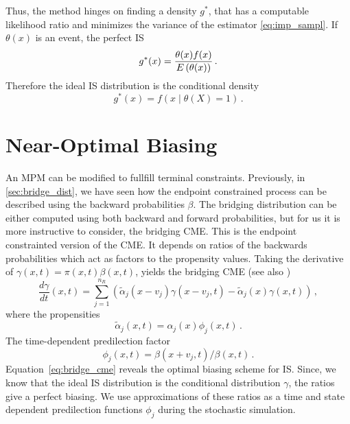 Thus, the method hinges on finding a density $g^{*}$, that has a computable likelihood ratio and  minimizes the variance of the estimator \eqref{eq:imp_sampl}.
If $\theta(x)$ is an event, the perfect \ac{IS} \parencite[Chapter~9.7.1]{kroese2013handbook}
\[
    g^*(x) = \frac{\theta(x) f(x)}{{E}\left(\theta(x)\right)}\,.
\]
Therefore the ideal \ac{IS} distribution is the conditional density
\[
    g^*(x) = f(x \mid \theta(X) = 1)\,.
\]

\section{Near-Optimal Biasing}
An \ac{MPM} can be modified to fullfill terminal constraints.
Previously, in \autoref{sec:bridge_dist}, we have seen how the endpoint constrained process can be described using the backward probabilities $\beta$.
The bridging distribution can be either computed using both backward and forward probabilities, but for us it is more instructive to consider, the bridging \ac{CME}.
This is the endpoint constrainted version of the \ac{CME}.
It depends on ratios of the backwards probabilities which act as factors to the propensity values.
Taking the derivative of $\gamma(x,t)=\pi(x,t)\beta(x,t)$, yields the bridging \ac{CME} (see also \citet{huang2016reconstructing})
\begin{equation}\label{eq:bridge_cme}
    \frac{d\gamma}{d t} ( x,t) =
    \sum_{j=1}^{n_R}\left(
        \tilde{\alpha}_j( x- v_j)\gamma( x- v_j,t) - \tilde{\alpha}_j( x)\gamma( x,t)
    \right)\,,
\end{equation}
where the propensities
\begin{equation}
    \tilde{\alpha}_j(x, t) = \alpha_j(x)\phi_j(x, t)\,.
\end{equation}
The time-dependent predilection factor
\begin{equation}\label{eq:dyn_predilection}
    \phi_j(x, t) = {\beta(x + v_j, t)}/{\beta(x, t)}\,.
\end{equation}
Equation~\eqref{eq:bridge_cme} reveals the optimal biasing scheme for \ac{IS}.
Since, we know that the ideal \ac{IS} distribution is the conditional distribution $\gamma$, the ratios
give a perfect biasing.
We use approximations of these ratios as a time and state dependent predilection functions $\phi_j$ during the stochastic simulation.

